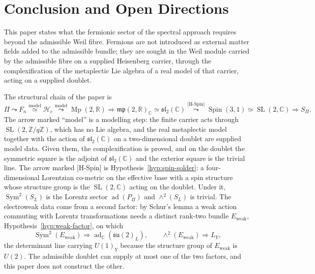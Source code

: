 \documentclass[11pt,a4paper]{article}
\theoremstyle{definition}
\theoremstyle{remark}
\newcommand{\Mp}{\operatorname{Mp}}
\newcommand{\Spin}{\operatorname{Spin}}
\newcommand{\SL}{\operatorname{SL}}
\begin{document}
    \newpage
  \section{Conclusion and Open Directions}
  \label{sec:conclusion}

  This paper states what the fermionic sector of the spectral approach requires beyond the admissible
  Weil fibre.
  Fermions are not introduced as external matter fields added to the admissible bundle; they are sought
  in the Weil module carried by the admissible fibre on a supplied Heisenberg carrier, through the
  complexification of the metaplectic Lie algebra of a real model of that carrier, acting on a supplied
  doublet.

  The structural chain of the paper is
  \[
    \Pi
    \leadsto
    F_n \overset{\text{model}}{\simeq} \mathcal{H}_c
    \overset{\text{model}}{\leadsto}
    \Mp(2,\mathbb{R})
    \Rightarrow
    \mathfrak{mp}(2,\mathbb{R})_{\mathbb{C}} \simeq \mathfrak{sl}_2(\mathbb{C})
    \overset{\text{[H-Spin]}}{\leadsto}
    \Spin(3,1) \simeq \SL(2,\mathbb{C})
    \Rightarrow
    S_\Pi .
  \]
  The arrow marked ``model'' is a modelling step: the finite carrier acts through
  $\SL(2,\mathbb{Z}/q\mathbb{Z})$, which has no Lie algebra, and the real metaplectic model together with
  the action of $\mathfrak{sl}_2(\mathbb{C})$ on a two-dimensional doublet are supplied model data.
  Given them, the complexification is proved, and on the doublet the symmetric square is the adjoint of
  $\mathfrak{sl}_2(\mathbb{C})$ and the exterior square is the trivial line.
  The arrow marked [H-Spin] is Hypothesis~\ref{hyp:spin-solder}: a four-dimensional Lorentzian co-metric
  on the effective base with a spin structure whose structure group is the $\SL(2,\mathbb{C})$ acting on
  the doublet.
  Under it, $\operatorname{Sym}^2(S_L)$ is the Lorentz sector $\operatorname{ad}(P_\Pi)$ and
  $\wedge^2(S_L)$ is trivial.
  The electroweak data come from a second factor: by Schur's lemma a weak action commuting with Lorentz
  transformations needs a distinct rank-two bundle $E_{\mathrm{weak}}$, Hypothesis~\ref{hyp:weak-factor},
  on which
  \[
    \operatorname{Sym}^2(E_{\mathrm{weak}})
    \Rightarrow
    \operatorname{ad}_{\mathbb{C}}(\mathfrak{su}(2)_L),
    \qquad
    \wedge^2(E_{\mathrm{weak}})
    \Rightarrow
    L_Y ,
  \]
  the determinant line carrying $U(1)_Y$ because the structure group of $E_{\mathrm{weak}}$ is $U(2)$.
  The admissible doublet can supply at most one of the two factors, and this paper does not construct
  the other.
\end{document}
